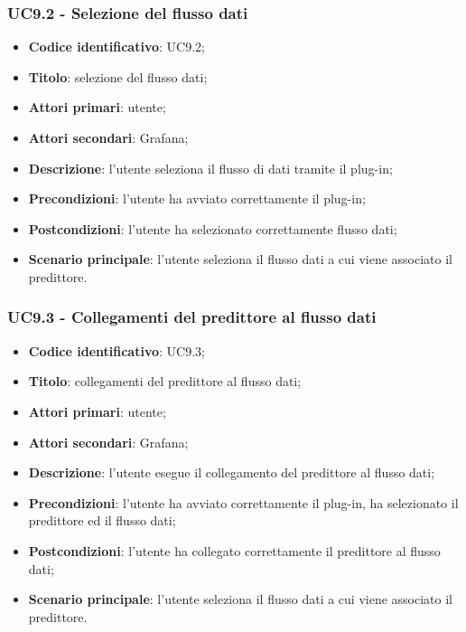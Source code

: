 \subsubsection{UC9.2 - Selezione del flusso dati}
\begin{itemize}
	\item \textbf{Codice identificativo}: UC9.2;
	\item \textbf{Titolo}: selezione del flusso dati;
	\item \textbf{Attori primari}: utente;
	\item \textbf{Attori secondari}: Grafana\glo;
	\item \textbf{Descrizione}: l'utente seleziona il flusso di dati tramite il plug-in;
	\item \textbf{Precondizioni}: l'utente ha avviato correttamente il plug-in;
	\item \textbf{Postcondizioni}: l'utente ha selezionato correttamente flusso dati;
	\item \textbf{Scenario principale}: l'utente seleziona il flusso dati a cui viene associato il predittore.
\end{itemize}

\subsubsection{UC9.3 - Collegamenti del predittore al flusso dati}
\begin{itemize}
	\item \textbf{Codice identificativo}: UC9.3;
	\item \textbf{Titolo}: collegamenti del predittore al flusso dati;
	\item \textbf{Attori primari}: utente;
	\item \textbf{Attori secondari}: Grafana\glo;
	\item \textbf{Descrizione}: l'utente esegue il collegamento del predittore al flusso dati;
	\item \textbf{Precondizioni}: l'utente ha avviato correttamente il plug-in, ha selezionato il predittore ed il flusso dati;
	\item \textbf{Postcondizioni}: l'utente ha collegato correttamente il predittore al flusso dati;
	\item \textbf{Scenario principale}: l'utente seleziona il flusso dati a cui viene associato il predittore.
\end{itemize}

